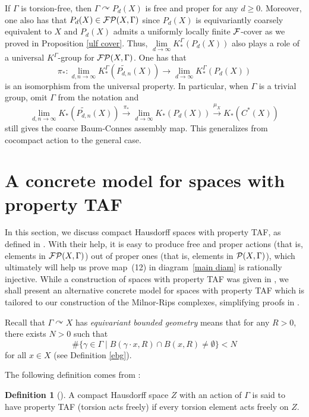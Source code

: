 \documentclass[11pt]{article}
\theoremstyle{definition}
\newtheorem{Def}{Definition}[section]
\theoremstyle{plain}
\def\MRdnX{\widetilde{P_{d,n}}(X)}
\def\Ga{\Gamma}
\def\car{\curvearrowright}
\begin{document}
If $\Ga$ is torsion-free, then $\Ga\car P_d(X)$ is free and proper for any $d\geq 0$. Moreover, one also has that  $P_d(X)\in \F\P(X,\Ga)$ since $P_d(X)$ is equivariantly coarsely equivalent to $X$ and $P_d(X)$ admits a uniformly locally finite $\mathcal F$-cover as we proved in Proposition \ref{ulf cover}. Thus, $\lim\limits_{d\to\infty}K_*^{\Ga}(P_d(X))$ also plays a role of a universal $K^{\Ga}$-group for $\F\P(X,\Ga)$. One has that
$$\pi_*:\lim_{d,n\to\infty}K^{\Ga}_*\left(\MRdnX\right)\to\lim_{d\to\infty}K_*^{\Ga}(P_d(X))$$
is an isomorphism from the universal property. In particular, when $\Ga$ is a trivial group, omit $\Ga$ from the notation and 
$$\lim_{d,n\to\infty}K_*\left(\MRdnX\right)\xrightarrow{\pi_*}\lim_{d\to\infty}K_*(P_d(X))\xrightarrow{\mu_X}K_*(C^*(X))$$
still gives the coarse Baum-Connes assembly map. This generalizes \cite[Lemma 2.2]{Yu1995} from cocompact action to the general case.



\section{A concrete model for spaces with property TAF}\label{sec: A Concrete model for space with Property TAF}

In this section, we discuss compact Hausdorff spaces with property TAF, as defined in \cite[Definition~5.2]{AAS2020}. 
With their help, it is easy to produce free and proper actions (that is, elements in $\F\P(X,\Ga)$) out of proper ones (that is, elements in $\P(X,\Ga)$), which ultimately will help us prove map~(12) in diagram~\eqref{main diam} is rationally injective. 
While a construction of spaces with property TAF was given in \cite[Definition~5.6]{AAS2020}, we shall present an alternative concrete model for spaces with property TAF which is tailored to our construction of the Milnor-Rips complexes, simplifying proofs in . 


Recall that $\Ga\car X$ has \emph{equivariant bounded geometry} means that for any $R>0$, there exists $N>0$ such that 
$$\#\{\gamma\in\Ga\mid B(\gamma\cdot x,R)\cap B(x,R)\ne\emptyset\}<N$$
for all $x\in X$ (see Definition \ref{ebg}).

The following definition comes from \cite{AAS2020}:

\begin{Def}[\cite{AAS2020}]
A compact Hausdorff space $Z$ with an action of $\Ga$ is said to have property TAF (torsion acts freely) if every torsion element acts freely on $Z$.
\end{Def}
\end{document}
